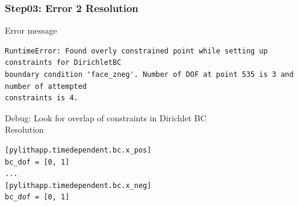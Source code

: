 \documentclass[aspectration=169]{beamer}
\newcommand{\errlabel}[1]{{\small \color{blue}#1}}
\newcommand{\debuginfo}[1]{{\small \color{green}#1}}
\begin{document}
\begin{frame}[fragile]
  \frametitle{Step03: Error 2 Resolution}

\errlabel{Error message}
\begin{lstlisting}
RuntimeError: Found overly constrained point while setting up constraints for DirichletBC
boundary condition 'face_zneg'. Number of DOF at point 535 is 3 and number of attempted
constraints is 4.
\end{lstlisting}\pause
\errlabel{Debug:} \debuginfo{Look for overlap of constraints in Dirichlet BC}\pause\\
\errlabel{Resolution}
\begin{lstlisting}
[pylithapp.timedependent.bc.x_pos]
bc_dof = [0, 1]
...
[pylithapp.timedependent.bc.x_neg]
bc_dof = [0, 1]
\end{lstlisting}

\end{frame}
\end{document}

